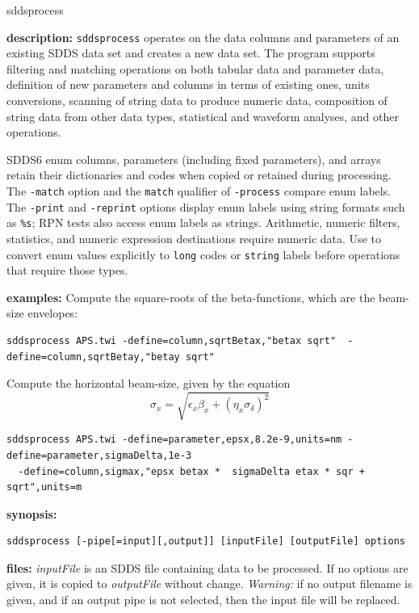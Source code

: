 \newpage
\begin{sddsprog}{sddsprocess}
  \item \textbf{description:}
  \verb|sddsprocess| operates on the data columns and parameters of an existing SDDS data set and creates a new
  data set.  The program supports filtering and matching operations on both tabular data and parameter
  data, definition of new parameters and columns in terms of existing ones, units conversions, scanning of
  string data to produce numeric data, composition of string data from other data types,
  statistical and waveform analyses, and other operations.

  SDDS6 enum columns, parameters (including fixed parameters), and arrays retain their
  dictionaries and codes when copied or retained during processing.  The \verb|-match|
  option and the \verb|match| qualifier of \verb|-process| compare enum labels.
  The \verb|-print| and \verb|-reprint| options display enum labels using string formats
  such as \verb|%s|; RPN tests also access enum labels as strings.  Arithmetic, numeric
  filters, statistics, and numeric expression destinations require numeric data.
  Use  to convert enum values explicitly to \verb|long| codes or
  \verb|string| labels before operations that require those types.
  \item \textbf{examples:}
  Compute the square-roots of the beta-functions, which are the beam-size envelopes:
\begin{verbatim}
sddsprocess APS.twi -define=column,sqrtBetax,"betax sqrt"  -define=column,sqrtBetay,"betay sqrt"
\end{verbatim}
  Compute the horizontal beam-size, given by the equation
  \[ \sigma_x = \sqrt{ \epsilon_x \beta_x + (\eta_x \sigma_\delta)^2} \]
\begin{verbatim}
sddsprocess APS.twi -define=parameter,epsx,8.2e-9,units=nm -define=parameter,sigmaDelta,1e-3
  -define=column,sigmax,"epsx betax *  sigmaDelta etax * sqr + sqrt",units=m
\end{verbatim}
  \item \textbf{synopsis:}
\begin{verbatim}
sddsprocess [-pipe[=input][,output]] [inputFile] [outputFile] options
\end{verbatim}
  \item \textbf{files:}
{\em inputFile} is an SDDS file containing data to be processed.  If no options are given, it is copied to {\em
outputFile} without change.  {\em Warning:} if no output filename is given, and if an output pipe is not selected,
then the input file will be replaced.


\end{sddsprog}
